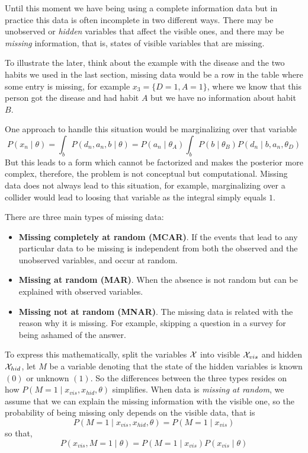 

Until this moment we have being using a complete information data but in practice this data is often incomplete in two different ways. There may be unobserved or \emph{hidden} variables that affect the visible ones, and there may be \emph{missing} information, that is, states of visible variables that are missing.

To illustrate the later, think about the example with the disease and the two habits we used in the last section, missing data would be a row in the table where some entry is missing, for example \(x_{3} = \{D = 1, A = 1\}\), where we know that this person got the disease and had habit \(A\) but we have no information about habit \(B\).

One approach to handle this situation would be marginalizing over that variable
\[
  P(x_{n} \mid \theta) = \int_{b}P(d_{n}, a_{n}, b \mid \theta) = P(a_{n} \mid \theta_{A})\int_{b}P(b \mid \theta_{B})P(d_{n} \mid b, a_{n}, \theta_{D})
\]
But this leads to a form which cannot be factorized and makes the posterior more complex, therefore, the problem is not conceptual but computational. Missing data does not always lead to this situation, for example, marginalizing over a collider would lead to loosing that variable as the integral simply equals \(1\).

There are three main types of missing data:
\begin{itemize}
  \item \textbf{Missing completely at random (MCAR)}. If the events that lead to any particular data to be missing is independent from both the observed and the unobserved variables, and occur at random.
  \item \textbf{Missing at random (MAR)}. When the absence is not random but can be explained with observed variables.
  \item \textbf{Missing not at random (MNAR)}. The missing data is related with the reason why it is missing. For example, skipping a question in a survey for being ashamed of the answer.
\end{itemize}

To express this mathematically, split the variables \(\mathcal{X}\) into visible \(\mathcal{X}_{vis}\) and hidden \(\mathcal{X}_{hid}\), let \(M\) be a variable denoting that the state of the hidden variables is known \((0)\) or unknown \((1)\).
So the differences between the three types resides on how \(P(M = 1 \mid x_{vis}, x_{hid}, \theta)\) simplifies. When data is \emph{missing at random}, we assume that we can explain the missing information with the visible one, so the probability of being missing only depends on the visible data, that is
\[
  P(M = 1 \mid x_{vis}, x_{hid}, \theta) = P(M = 1 \mid x_{vis})
\]
so that,
\[
  P(x_{vis}, M = 1 \mid \theta) = P(M = 1 \mid x_{vis})P(x_{vis} \mid \theta)
\]

